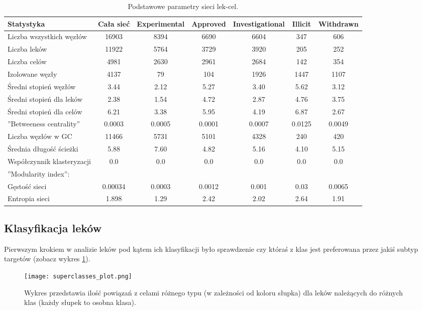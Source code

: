 \documentclass[11pt]{article}
\begin{document}
\begin{table}[h!]
\caption{Podstawowe parametry sieci lek-cel.}
\label{t:stats_drug}
\begin{tabular}{l|c|c|c|c|c|c}

	Statystyka & Cała sieć & Experimental & Approved & Investigational & Illicit & Withdrawn\\
	\hline
	Liczba wszystkich węzłów & 16903 & 8394 & 6690 & 6604 & 347 & 606\\
	Liczba leków & 11922 & 5764 & 3729 & 3920 & 205 & 252\\
	Liczba celów & 4981 & 2630 & 2961 & 2684 & 142 & 354\\
	Izolowane węzły & 4137 & 79 & 104 & 1926 & 1447 & 1107\\
	Średni stopień węzłów & 3.44 & 2.12 & 5.27 & 3.40 & 5.62 & 3.12\\
	Średni stopień dla leków & 2.38 & 1.54 & 4.72 & 2.87 & 4.76 & 3.75\\
	Średni stopień dla celów & 6.21 & 3.38 & 5.95 & 4.19 & 6.87 & 2.67\\
	''Betweeness centrality'' & 0.0003 & 0.0005 & 0.0001 & 0.0007 & 0.0125 & 0.0049\\
	Liczba węzłów w GC & 11466 & 5731 & 5101 & 4328 & 240 & 420\\
	Średnia długość ścieżki & 5.88 & 7.60 & 4.82 & 5.16 & 4.10 & 5.15\\
	Współczynnik klasteryzacji & 0.0 & 0.0 & 0.0 & 0.0 & 0.0 & 0.0\\
	''Modularity index'': & \\
	Gęstość sieci & 0.00034 & 0.0003 & 0.0012 & 0.001 & 0.03 & 0.0065\\
	Entropia sieci & 1.898 & 1.29 & 2.42 & 2.02 & 2.64 & 1.91\\

\end{tabular}
\end{table}

\subsection{Klasyfikacja leków}

Pierwszym krokiem w analizie leków pod kątem ich klasyfikacji było sprawdzenie czy któraś z klas jest preferowana przez jakiś subtyp targetów (zobacz wykres \ref{fig:class_subtype}).

\begin{figure}[h!]
\begin{center}
\texttt{[image: superclasses\_plot.png]}
\caption{Wykres przedstawia ilość powiązań z celami różnego typu (w zależności od koloru słupka) dla leków należących do różnych klas (każdy słupek to osobna klasa).}
\label{fig:class_subtype}
\end{center}
\end{figure}
\end{document}
